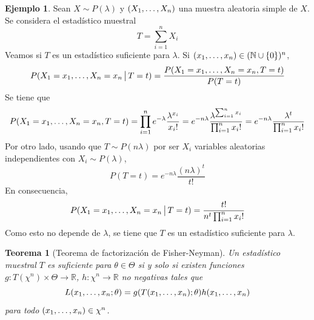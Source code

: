 \documentclass[11pt]{report}
\newtheorem{theorem}{Teorema}
\theoremstyle{definition}
\newtheorem{example}{Ejemplo}
\newcommand{\R}{\mathbb R}
\newcommand{\N}{\mathbb N}
\begin{document}
\begin{example}
Sean $X \sim P(\lambda)$ y $(X_1,\mathellipsis,X_n)$ una muestra aleatoria simple de $X$. Se considera el estadístico muestral
\[T=\sum_{i=1}^nX_i\]
Veamos si $T$ es un estadístico suficiente para $\lambda$. Si $(x_1,\mathellipsis,x_n) \in (\N \cup \{0\})^n$,
\[P(X_1=x_1,\mathellipsis,X_n=x_n \, \big| \, T=t) = \frac{P(X_1=x_1,\mathellipsis,X_n=x_n, T=t)}{P(T=t)}\]
Se tiene que
\[P(X_1=x_1,\mathellipsis,X_n=x_n, T=t) = \prod_{i=1}^n e^{-\lambda} \frac{\lambda^{x_i}}{x_i!} = e^{-n\lambda}\frac{\lambda^{\sum_{i=1}^n x_i}}{\prod_{i=1}^n x_i!}= e^{-n\lambda}\frac{\lambda^t}{\prod_{i=1}^nx_i!}\]
Por otro lado, usando que $T \sim P(n\lambda)$ por ser $X_i$ variables aleatorias independientes con $X_i \sim P(\lambda)$,
\[P(T=t) = e^{-n\lambda}\frac{(n\lambda)^t}{t!} \]
En consecuencia,
\[P(X_1=x_1,\mathellipsis,X_n=x_n \, \big| \, T=t) = \frac{t!}{n^t\prod_{i=1}^nx_i!}\]
Como esto no depende de $\lambda$, se tiene que $T$ es un estadístico suficiente para $\lambda$.
\end{example}

\begin{theorem}[Teorema de factorización de Fisher-Neyman]
Un estadístico muestral $T$ es suficiente para $\theta \in \Theta$ si y solo si existen funciones $g \colon T(\chi^n) \times \Theta \to \R$, $h \colon \chi^n \to \R$ no negativas tales que 
\[L(x_1,\mathellipsis,x_n;\theta) = g(T(x_1,\mathellipsis,x_n);\theta)h(x_1,\mathellipsis,x_n)\]
para todo $(x_1,\mathellipsis,x_n) \in \chi^n$.
\end{theorem}
\end{document}
